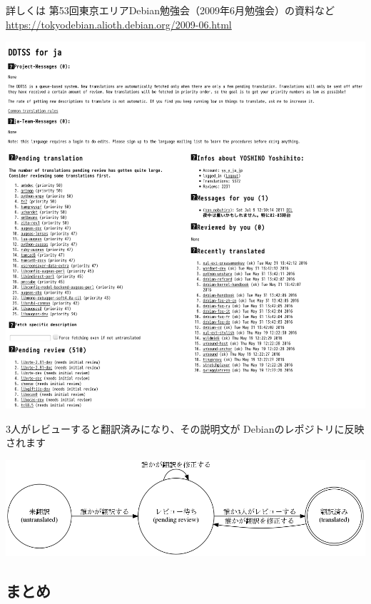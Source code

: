 \documentclass[mingoth,a4paper]{jsarticle}
\begin{document}
   詳しくは 第53回東京エリアDebian勉強会（2009年6月勉強会）の資料など\\
   \url{https://tokyodebian.alioth.debian.org/2009-06.html}

   \begin{center}
  \includegraphics[width=0.9\hsize]{image201606/ddtss_mono.png}
   \end{center}

  3人がレビューすると翻訳済みになり、その説明文が Debianのレポジトリに反映されます

  \begin{center}
  \includegraphics[width=0.9\hsize]{image201606/ddtss-flow_mono.png}
   \end{center}

\subsection{まとめ}
\end{document}
